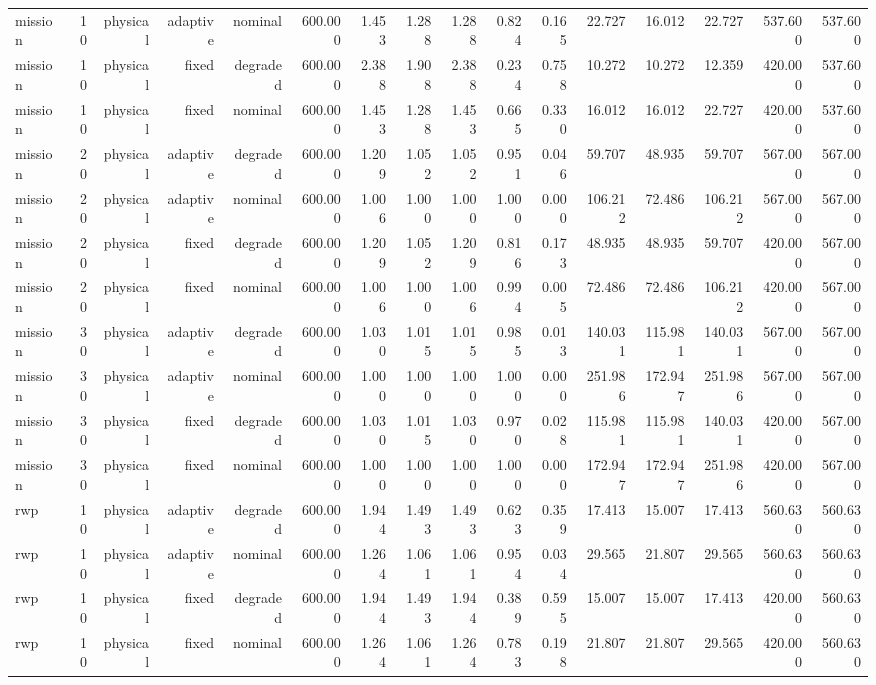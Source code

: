 \begin{tabular}{lrrrrrrrrrrrrrrr}
mission & 10 & physical & adaptive & nominal & 600.000 & 1.453 & 1.288 & 1.288 & 0.824 & 0.165 & 22.727 & 16.012 & 22.727 & 537.600 & 537.600 \\
mission & 10 & physical & fixed & degraded & 600.000 & 2.388 & 1.908 & 2.388 & 0.234 & 0.758 & 10.272 & 10.272 & 12.359 & 420.000 & 537.600 \\
mission & 10 & physical & fixed & nominal & 600.000 & 1.453 & 1.288 & 1.453 & 0.665 & 0.330 & 16.012 & 16.012 & 22.727 & 420.000 & 537.600 \\
mission & 20 & physical & adaptive & degraded & 600.000 & 1.209 & 1.052 & 1.052 & 0.951 & 0.046 & 59.707 & 48.935 & 59.707 & 567.000 & 567.000 \\
mission & 20 & physical & adaptive & nominal & 600.000 & 1.006 & 1.000 & 1.000 & 1.000 & 0.000 & 106.212 & 72.486 & 106.212 & 567.000 & 567.000 \\
mission & 20 & physical & fixed & degraded & 600.000 & 1.209 & 1.052 & 1.209 & 0.816 & 0.173 & 48.935 & 48.935 & 59.707 & 420.000 & 567.000 \\
mission & 20 & physical & fixed & nominal & 600.000 & 1.006 & 1.000 & 1.006 & 0.994 & 0.005 & 72.486 & 72.486 & 106.212 & 420.000 & 567.000 \\
mission & 30 & physical & adaptive & degraded & 600.000 & 1.030 & 1.015 & 1.015 & 0.985 & 0.013 & 140.031 & 115.981 & 140.031 & 567.000 & 567.000 \\
mission & 30 & physical & adaptive & nominal & 600.000 & 1.000 & 1.000 & 1.000 & 1.000 & 0.000 & 251.986 & 172.947 & 251.986 & 567.000 & 567.000 \\
mission & 30 & physical & fixed & degraded & 600.000 & 1.030 & 1.015 & 1.030 & 0.970 & 0.028 & 115.981 & 115.981 & 140.031 & 420.000 & 567.000 \\
mission & 30 & physical & fixed & nominal & 600.000 & 1.000 & 1.000 & 1.000 & 1.000 & 0.000 & 172.947 & 172.947 & 251.986 & 420.000 & 567.000 \\
rwp & 10 & physical & adaptive & degraded & 600.000 & 1.944 & 1.493 & 1.493 & 0.623 & 0.359 & 17.413 & 15.007 & 17.413 & 560.630 & 560.630 \\
rwp & 10 & physical & adaptive & nominal & 600.000 & 1.264 & 1.061 & 1.061 & 0.954 & 0.034 & 29.565 & 21.807 & 29.565 & 560.630 & 560.630 \\
rwp & 10 & physical & fixed & degraded & 600.000 & 1.944 & 1.493 & 1.944 & 0.389 & 0.595 & 15.007 & 15.007 & 17.413 & 420.000 & 560.630 \\
rwp & 10 & physical & fixed & nominal & 600.000 & 1.264 & 1.061 & 1.264 & 0.783 & 0.198 & 21.807 & 21.807 & 29.565 & 420.000 & 560.630 \\

\end{tabular}

